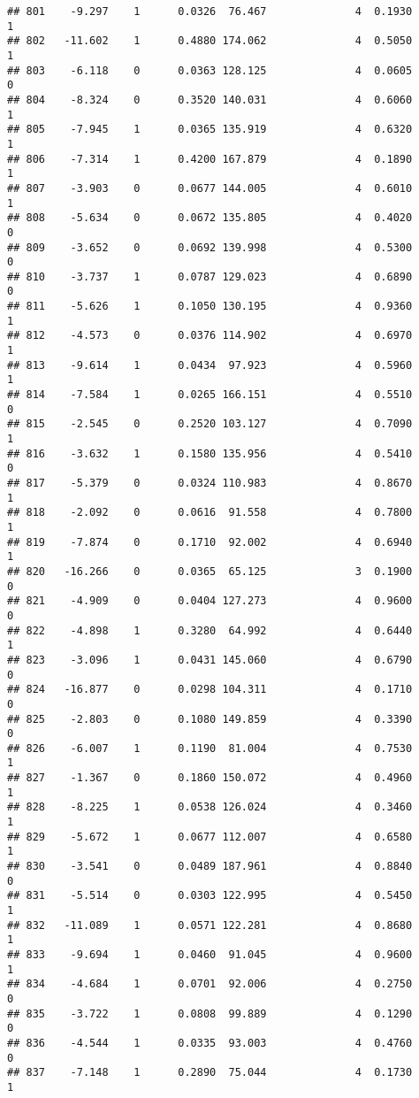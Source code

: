 \documentclass[
]{article}
\begin{document}
\begin{verbatim}
## 801    -9.297    1      0.0326  76.467              4  0.1930      1
## 802   -11.602    1      0.4880 174.062              4  0.5050      1
## 803    -6.118    0      0.0363 128.125              4  0.0605      0
## 804    -8.324    0      0.3520 140.031              4  0.6060      1
## 805    -7.945    1      0.0365 135.919              4  0.6320      1
## 806    -7.314    1      0.4200 167.879              4  0.1890      1
## 807    -3.903    0      0.0677 144.005              4  0.6010      1
## 808    -5.634    0      0.0672 135.805              4  0.4020      0
## 809    -3.652    0      0.0692 139.998              4  0.5300      0
## 810    -3.737    1      0.0787 129.023              4  0.6890      0
## 811    -5.626    1      0.1050 130.195              4  0.9360      1
## 812    -4.573    0      0.0376 114.902              4  0.6970      1
## 813    -9.614    1      0.0434  97.923              4  0.5960      1
## 814    -7.584    1      0.0265 166.151              4  0.5510      0
## 815    -2.545    0      0.2520 103.127              4  0.7090      1
## 816    -3.632    1      0.1580 135.956              4  0.5410      0
## 817    -5.379    0      0.0324 110.983              4  0.8670      1
## 818    -2.092    0      0.0616  91.558              4  0.7800      1
## 819    -7.874    0      0.1710  92.002              4  0.6940      1
## 820   -16.266    0      0.0365  65.125              3  0.1900      0
## 821    -4.909    0      0.0404 127.273              4  0.9600      0
## 822    -4.898    1      0.3280  64.992              4  0.6440      1
## 823    -3.096    1      0.0431 145.060              4  0.6790      0
## 824   -16.877    0      0.0298 104.311              4  0.1710      0
## 825    -2.803    0      0.1080 149.859              4  0.3390      0
## 826    -6.007    1      0.1190  81.004              4  0.7530      1
## 827    -1.367    0      0.1860 150.072              4  0.4960      1
## 828    -8.225    1      0.0538 126.024              4  0.3460      1
## 829    -5.672    1      0.0677 112.007              4  0.6580      1
## 830    -3.541    0      0.0489 187.961              4  0.8840      0
## 831    -5.514    0      0.0303 122.995              4  0.5450      1
## 832   -11.089    1      0.0571 122.281              4  0.8680      1
## 833    -9.694    1      0.0460  91.045              4  0.9600      1
## 834    -4.684    1      0.0701  92.006              4  0.2750      0
## 835    -3.722    1      0.0808  99.889              4  0.1290      0
## 836    -4.544    1      0.0335  93.003              4  0.4760      0
## 837    -7.148    1      0.2890  75.044              4  0.1730      1

\end{verbatim}
\end{document}
